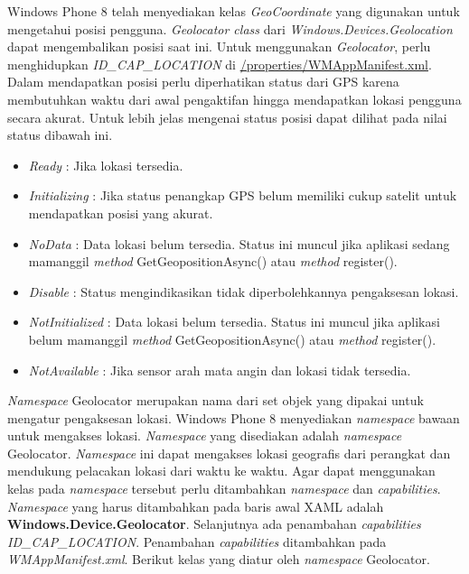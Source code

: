 \label{subsubsec:Mendapatkan Posisi Pengguna}
\hspace{0.5cm} Windows Phone 8 telah menyediakan kelas \textit{GeoCoordinate} yang digunakan untuk mengetahui posisi pengguna. \textit{Geolocator class} dari \textit{Windows.Devices.Geolocation} dapat mengembalikan posisi saat ini. Untuk menggunakan \textit{Geolocator}, perlu menghidupkan \textit{ID\_CAP\_LOCATION} di \url{/properties/WMAppManifest.xml}. Dalam mendapatkan posisi perlu diperhatikan status dari GPS karena membutuhkan waktu dari awal pengaktifan hingga mendapatkan lokasi pengguna secara akurat. Untuk lebih jelas mengenai status posisi dapat dilihat pada nilai status dibawah ini.

\begin{itemize}
	\item \textit{Ready} : Jika lokasi tersedia.
	\item \textit{Initializing} : Jika status penangkap GPS belum memiliki cukup satelit untuk mendapatkan posisi yang akurat. 
	\item \textit{NoData} : Data lokasi belum tersedia. Status ini muncul jika aplikasi sedang mamanggil \textit{method} GetGeopositionAsync() atau \textit{method} register().
	\item \textit{Disable} : Status mengindikasikan tidak diperbolehkannya pengaksesan lokasi.
	\item \textit{NotInitialized} : Data lokasi belum tersedia. Status ini muncul jika aplikasi belum mamanggil \textit{method} GetGeopositionAsync() atau \textit{method} register().
	\item \textit{NotAvailable} : Jika sensor arah mata angin dan lokasi tidak tersedia.
\end{itemize}

\label{subsubsec:Namespace Geolocator}
\hspace{0.5cm} \textit{Namespace} Geolocator merupakan nama dari set objek yang dipakai untuk mengatur pengaksesan lokasi. Windows Phone 8 menyediakan \textit{namespace} bawaan untuk mengakses lokasi. \textit{Namespace} yang disediakan adalah \textit{namespace} Geolocator. \textit{Namespace} ini dapat mengakses lokasi geografis dari perangkat dan mendukung pelacakan lokasi dari waktu ke waktu. Agar dapat menggunakan kelas pada \textit{namespace} tersebut perlu ditambahkan \textit{namespace} dan \textit{capabilities}. \textit{Namespace} yang harus ditambahkan pada baris awal XAML adalah \textbf{Windows.Device.Geolocator}. Selanjutnya ada penambahan \textit{capabilities ID\_CAP\_LOCATION}. Penambahan \textit{capabilities} ditambahkan pada \textit{WMAppManifest.xml}. Berikut kelas yang diatur oleh \textit{namespace} Geolocator\cite{DevWP8}.

